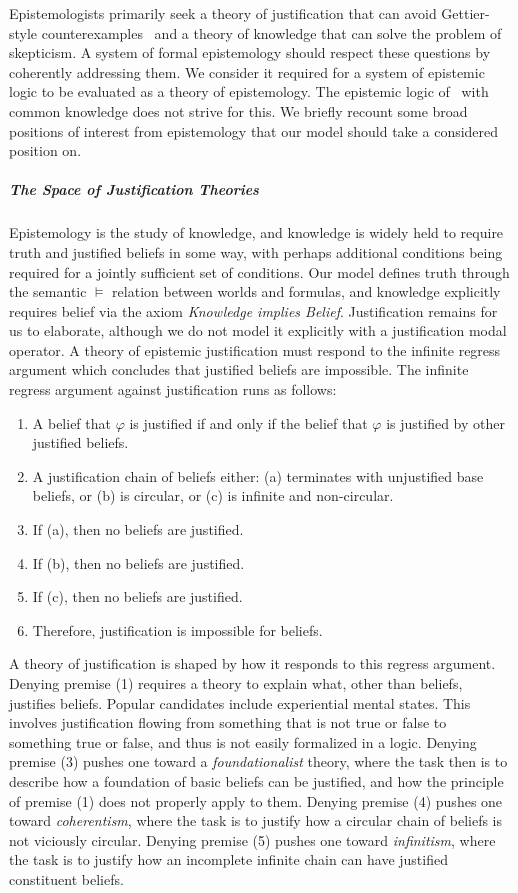 Epistemologists primarily seek a theory of justification that can avoid Gettier-style counterexamples~\cite{Gettier} and a theory of knowledge that can solve the problem of skepticism. A system of formal epistemology should respect these questions by coherently addressing them. We consider it required for a system of epistemic logic to be evaluated as a theory of epistemology. The epistemic logic of \SFive\ with common knowledge does not strive for this. We briefly recount some broad positions of interest from epistemology that our model should take a considered position on.


\subparagraph{The Space of Justification Theories}
Epistemology is the study of knowledge, and knowledge is widely held to require truth and justified beliefs in some way, with perhaps additional conditions being required for a jointly sufficient set of conditions. Our model defines truth through the semantic $\models$ relation between worlds and formulas, and knowledge explicitly requires belief via the axiom \emph{Knowledge implies Belief}. Justification remains for us to elaborate, although we do not model it explicitly with a justification modal operator. A theory of epistemic justification must respond to the infinite regress argument which concludes that justified beliefs are impossible. The infinite regress argument against justification runs as follows:
\begin{enumerate}
	\item A belief that $\varphi$ is justified if and only if the belief that $\varphi$ is justified by other justified beliefs.
	\item A justification chain of beliefs either: (a) terminates with unjustified base beliefs, or (b) is circular, or (c) is infinite and non-circular.
	\item If (a), then no beliefs are justified.
	\item If (b), then no beliefs are justified.
	\item If (c), then no beliefs are justified.
	\item Therefore, justification is impossible for beliefs.
\end{enumerate}
A theory of justification is shaped by how it responds to this regress argument. Denying premise (1) requires a theory to explain what, other than beliefs, justifies beliefs. Popular candidates include experiential mental states. This involves justification flowing from something that is not true or false to something true or false, and thus is not easily formalized in a logic. Denying premise (3) pushes one toward a \emph{foundationalist} theory, where the task then is to describe how a foundation of basic beliefs can be justified, and how the principle of premise (1) does not properly apply to them. Denying premise (4) pushes one toward \emph{coherentism}, where the task is to justify how a circular chain of beliefs is not viciously circular. Denying premise (5) pushes one toward \emph{infinitism}, where the task is to justify how an incomplete infinite chain can have justified constituent beliefs.

